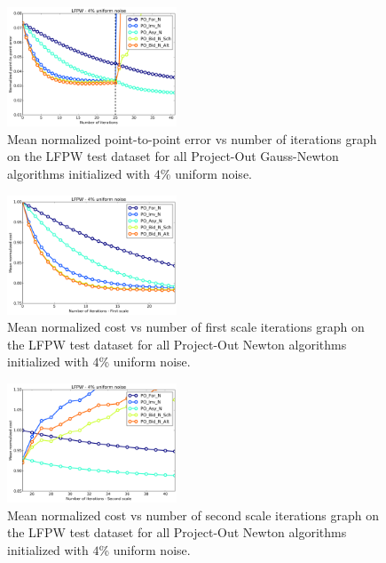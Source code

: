 \begin{figure}[h!]
    \centering
    \includegraphics[width=0.45\textwidth]{experiments/algorithms/po_n/mean_error_vs_iters_po_n_4.png}
    \caption{Mean normalized point-to-point error vs number of iterations graph on the LFPW test dataset for all Project-Out Gauss-Newton algorithms initialized with $4$\% uniform noise.}
    \label{fig:mean_error_vs_iters_po_n_4}
\end{figure}

\begin{figure}[h!]
    \centering
    \includegraphics[width=0.45\textwidth]{experiments/algorithms/po_n/mean_cost_vs_iters1_po_n_4.png}
    \caption{Mean normalized cost vs number of first scale iterations graph on the LFPW test dataset for all Project-Out Newton algorithms initialized with $4$\% uniform noise.}
    \label{fig:mean_cost_vs_iters1_po_n_4}
\end{figure}

\begin{figure}[h!]
    \centering
    \includegraphics[width=0.45\textwidth]{experiments/algorithms/po_n/mean_cost_vs_iters2_po_n_4.png}
    \caption{Mean normalized cost vs number of second scale iterations graph on the LFPW test dataset for all Project-Out Newton algorithms initialized with $4$\% uniform noise.}
    \label{fig:mean_cost_vs_iters2_po_n_4}
\end{figure}


